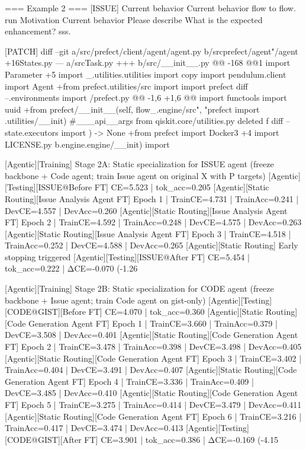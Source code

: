  === Example 2 ===
 [ISSUE]
 Current behavior Current behavior flow to flow. run Motivation Current behavior Please describe What is the expected enhancement? sss.
 
 [PATCH]
 diff --git a/src/prefect/client/agent/agent.py b/srcprefect/agent"/agent +16States.py --- a/srcTask.py +++ b/src/__init__.py @@ -168 @@1 import Parameter +5 import _.utilities.utilities import copy import pendulum.client import Agent +from prefect.utilities/src import  import prefect diff --.environments import /prefect.py @@ -1,6 +1,6 @@ import functools import uuid +from prefect/__init__(self, flow_.engine/src", "prefect import .utilities/__init) #___api__args from qiskit.core/utilities.py deleted f diff --state.executors import ) -> None +from prefect import Docker3 +4 import LICENSE.py b.engine.engine/__init) import 
 
 [Agentic][Training] Stage 2A: Static specialization for ISSUE agent (freeze backbone + Code agent; train Issue agent on original X with P targets)
 [Agentic][Testing][ISSUE@Before FT] CE=5.523 | tok_acc=0.205
 [Agentic][Static Routing][Issue Analysis Agent FT] Epoch 1 | TrainCE=4.731 | TrainAcc=0.241 | DevCE=4.557 | DevAcc=0.260
 [Agentic][Static Routing][Issue Analysis Agent FT] Epoch 2 | TrainCE=4.592 | TrainAcc=0.248 | DevCE=4.575 | DevAcc=0.263
 [Agentic][Static Routing][Issue Analysis Agent FT] Epoch 3 | TrainCE=4.518 | TrainAcc=0.252 | DevCE=4.588 | DevAcc=0.265
 [Agentic][Static Routing] Early stopping triggered
 [Agentic][Testing][ISSUE@After FT] CE=5.454 | tok_acc=0.222 | ΔCE=-0.070 (-1.26%
 
 [Agentic][Training] Stage 2B: Static specialization for CODE agent (freeze backbone + Issue agent; train Code agent on gist-only)
 [Agentic][Testing][CODE@GIST][Before FT] CE=4.070 | tok_acc=0.360
 [Agentic][Static Routing][Code Generation Agent FT] Epoch 1 | TrainCE=3.660 | TrainAcc=0.379 | DevCE=3.508 | DevAcc=0.401
 [Agentic][Static Routing][Code Generation Agent FT] Epoch 2 | TrainCE=3.478 | TrainAcc=0.398 | DevCE=3.498 | DevAcc=0.405
 [Agentic][Static Routing][Code Generation Agent FT] Epoch 3 | TrainCE=3.402 | TrainAcc=0.404 | DevCE=3.491 | DevAcc=0.407
 [Agentic][Static Routing][Code Generation Agent FT] Epoch 4 | TrainCE=3.336 | TrainAcc=0.409 | DevCE=3.485 | DevAcc=0.410
 [Agentic][Static Routing][Code Generation Agent FT] Epoch 5 | TrainCE=3.275 | TrainAcc=0.414 | DevCE=3.479 | DevAcc=0.411
 [Agentic][Static Routing][Code Generation Agent FT] Epoch 6 | TrainCE=3.216 | TrainAcc=0.417 | DevCE=3.474 | DevAcc=0.413
 [Agentic][Testing][CODE@GIST][After FT] CE=3.901 | tok_acc=0.386 | ΔCE=-0.169 (-4.15%
 
